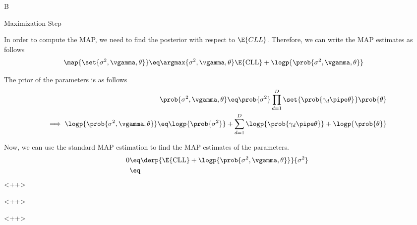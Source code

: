 \documentclass{article}
\newcommand{\ecll}{\E{\text{CLL}}}
\begin{document}
\begin{question}
\begin{qpart}{B}
		\begin{qsubsection}{Maximization Step}

			In order to compute the MAP, we need to find the posterior with respect to $\E{CLL}$. Therefore, we can write the MAP estimates as follows
			\begin{align*}
				\map{\set{\sigma^2, \vgamma, \theta}}	&\eq	\argmax{\sigma^2, \vgamma, \theta} \E{\text{CLL}} + \logp{\prob{\sigma^2, \vgamma, \theta}}
			\end{align*}


			The prior of the parameters is as follows
			\begin{align*}
				\prob{\sigma^2, \vgamma, \theta}	\eq	\prob{\sigma^2} \prod_{d = 1}^D \set{\prob{\gamma_d \pipe \theta}} \prob{\theta} \\
				\implies \logp{\prob{\sigma^2, \vgamma, \theta}}	\eq	\logp{\prob{\sigma^2}} + \sum_{d = 1}^D \logp{\prob{\gamma_d \pipe \theta}} + \logp{\prob{\theta}}
			\end{align*}

			Now, we can use the standard MAP estimation to find the MAP estimates of the parameters.
			\begin{align*}
				0	&\eq	\derp{\ecll + \logp{\prob{\sigma^2, \vgamma, \theta}}}{\sigma^2} \\
				&\eq	
			\end{align*}<++>

		\end{qsubsection}<++>

	\end{qpart}<++>

\end{question}
\end{document}
